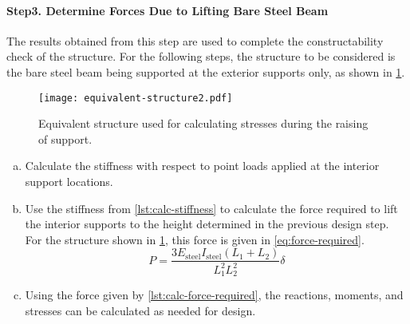 \paragraph*{Step3. Determine Forces Due to Lifting Bare Steel Beam}
The results obtained from this step are used to complete the constructability check of the structure. For the following steps, the structure to be considered is the bare steel beam being supported at the exterior supports only, as shown in \cref{fig:equivalent-structure2}.

\begin{figure}
  \texttt{[image: equivalent-structure2.pdf]}
  \caption{Equivalent structure used for calculating stresses during the raising of support.}
  \label{fig:equivalent-structure2}
\end{figure}

\begin{enumerate}[a)]
  \item\label{lst:calc-stiffness} Calculate the stiffness with respect to point loads applied at the interior support locations.
  \item\label{lst:calc-force-required} Use the stiffness from \ref{lst:calc-stiffness} to calculate the force required to lift the interior supports to the height determined in the previous design step. For the structure shown in \cref{fig:equivalent-structure2}, this force is given in \cref{eq:force-required}.
  \begin{equation}
    \label{eq:force-required}
    P = \frac{3E_\text{steel} I_\text{steel} (L_1+L_2)} {L_1^2L_2^2} \delta
  \end{equation}
  \item Using the force given by \ref{lst:calc-force-required}, the reactions, moments, and stresses can be calculated as needed for
  design.
\end{enumerate}

